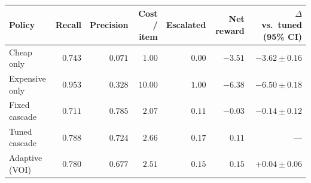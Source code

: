 \begin{tabular}{lrrrrrr}
\toprule
Policy & Recall & Precision & Cost / item & Escalated & Net reward & $\Delta$ vs.\ tuned (95\% CI) \\
\midrule
Cheap only & $0.743$ & $0.071$ & $1.00$ & $0.00$ & $-3.51$ & $-3.62 \pm 0.16$ \\
Expensive only & $0.953$ & $0.328$ & $10.00$ & $1.00$ & $-6.38$ & $-6.50 \pm 0.18$ \\
Fixed cascade & $0.711$ & $0.785$ & $2.07$ & $0.11$ & $-0.03$ & $-0.14 \pm 0.12$ \\
Tuned cascade & $0.788$ & $0.724$ & $2.66$ & $0.17$ & $0.11$ & --- \\
Adaptive (VOI) & $0.780$ & $0.677$ & $2.51$ & $0.15$ & $0.15$ & $+0.04 \pm 0.06$ \\
\bottomrule
\end{tabular}
